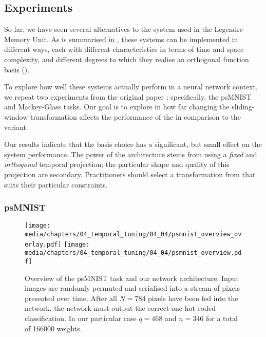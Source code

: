 \subsection{Experiments}
\label{sec:lmu_experiments}

So far, we have seen several alternatives to the \LDN system used in the Legendre Memory Unit.
As is summarised in , these systems can be implemented in different ways, each with different characteristics in terms of time and space complexity, and different degrees to which they realise an orthogonal function basis ().

To explore how well these systems actually perform in a neural network context, we repeat two experiments from the original \LMU paper \citep{voelker2019lmu}; specifically, the psMNIST and Mackey-Glass tasks.
Our goal is to explore in how far changing the sliding-window transformation affects the performance of the \LMU in comparison to the \LDN variant.

Our results indicate that the basis choice has a significant, but small effect on the system performance.
The power of the \LMU architecture stems from using a \emph{fixed} and \emph{orthogonal} temporal projection; the particular shape and quality of this projection are secondary.
Practitioners should select a transformation from  that suits their particular constraints.

\subsubsection{psMNIST}

\begin{figure}
	\texttt{[image: media/chapters/04\_temporal\_tuning/04\_04/psmnist\_overview\_overlay.pdf]}%
	\kern-158mm\texttt{[image: media/chapters/04\_temporal\_tuning/04\_04/psmnist\_overview.pdf]}%
	\caption[Overview of the psMNIST task and our network architecture]{Overview of the psMNIST task and our network architecture.
	Input images are randomly permuted and serialised into a stream of pixels presented over time.
	After all $N = 784$ pixels have been fed into the network, the network must output the correct one-hot coded classification.
	In our particular case $q = 468$ and $n = 346$ for a total of \num{166000} weights.}
	\label{fig:psmnist_overview}
\end{figure}

